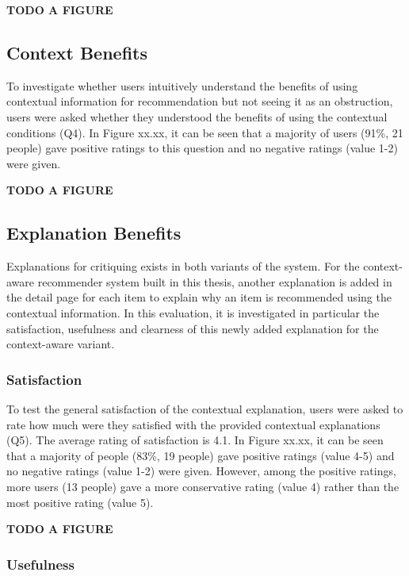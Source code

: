 \textbf{TODO A FIGURE}

\subsection{Context Benefits} \label{sec:results_cb}

To investigate whether users intuitively understand the benefits of using contextual information for recommendation but not seeing it as an obstruction, users were asked whether they understood the benefits of using the contextual conditions (Q4). In Figure xx.xx, it can be seen that a majority of users (91\%, 21 people) gave positive ratings to this question and no negative ratings (value 1-2) were given.

\textbf{TODO A FIGURE}

\subsection{Explanation Benefits} \label{sec:results_eb}

Explanations for critiquing exists in both variants of the system. For the context-aware recommender system built in this thesis, another explanation is added in the detail page for each item to explain why an item is recommended using the contextual information. In this evaluation, it is investigated in particular the satisfaction, usefulness and clearness of this newly added explanation for the context-aware variant.

\subsubsection{Satisfaction} \label{sec:results_eb_s}

To test the general satisfaction of the contextual explanation, users were asked to rate how much were they satisfied with the provided contextual explanations (Q5). The average rating of satisfaction is 4.1. In Figure xx.xx, it can be seen that a majority of people (83\%, 19 people) gave positive ratings (value 4-5) and no negative ratings (value 1-2) were given. However, among the positive ratings, more users (13 people) gave a more conservative rating (value 4) rather than the most positive rating (value 5).

\textbf{TODO A FIGURE}

\subsubsection{Usefulness} \label{sec:results_eb_u}

